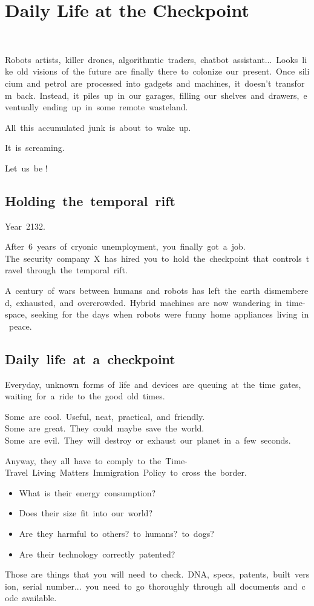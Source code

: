 \section{Daily Life at the Checkpoint}

~

Robots~artists,~killer~drones,~algorithmtic~traders,~chatbot~assistant...~Looks~like~old~visions~of~the~future~are~finally~there~to~colonize~our~present.~Once~silicium~and~petrol~are~processed~into~gadgets~and~machines,~it~doesn{\textquoteright}t~transform~back.~Instead,~it~piles~up~in~our~garages,~filling~our~shelves~and~drawers,~eventually~ending~up~in~some~remote~wasteland.

All~this~accumulated~junk~is~about~to~wake~up.~

It~is~screaming.~

Let~us~be !

\subsection{Holding~the~temporal~rift}

Year~2132.

After~6~years~of~cryonic~unemployment,~you~finally~got~a~job.\newline
The~security~company~X~has~hired~you~to~hold~the~checkpoint~that~controls~travel~through~the~temporal~rift.

A~century~of~wars~between~humans~and~robots~has~left~the~earth~dismembered,~exhausted,~and~overcrowded.~Hybrid~machines~are~now~wandering~in~time-space,~seeking~for~the~days~when~robots~were~funny~home~appliances~living~in~peace.

\subsection{Daily~life~at~a~checkpoint}

Everyday,~unknown~forms~of~life~and~devices~are~queuing~at~the~time~gates,~waiting~for~a~ride~to~the~good~old~times.

Some~are~cool.~Useful,~neat,~practical,~and~friendly.\newline
Some~are~great.~They~could~maybe~save~the~world.\newline
Some~are~evil.~They~will~destroy~or~exhaust~our~planet~in~a~few~seconds.

Anyway,~they~all~have~to~comply~to~the~Time-Travel~Living~Matters~Immigration~Policy~to~cross~the~border.

\begin{itemize}
\item What~is~their~energy~consumption? 
\item Does~their~size~fit~into~our~world? 
\item Are~they~harmful~to~others?~to~humans?~to~dogs? 
\item Are~their~technology~correctly~patented? 
\end{itemize}
Those~are~things~that~you~will~need~to~check.~DNA,~specs,~patents,~built~version,~serial~number...~you~need~to~go~thoroughly~through~all~documents~and~code~available.

